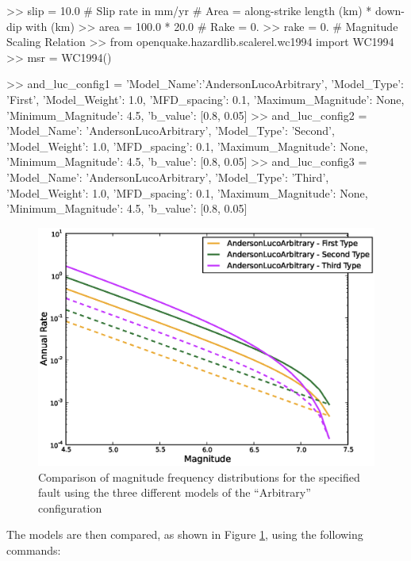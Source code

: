 \begin{python}[frame=single]
>> slip = 10.0  # Slip rate in mm/yr
# Area = along-strike length (km) * down-dip with (km)
>> area = 100.0 * 20.0
# Rake = 0.
>> rake = 0.
\# Magnitude Scaling Relation
>> from openquake.hazardlib.scalerel.wc1994 import WC1994
>> msr = WC1994()

>> and_luc_config1 = {'Model_Name':'AndersonLucoArbitrary',
                      'Model_Type': 'First',
                      'Model_Weight': 1.0,  
                      'MFD_spacing': 0.1,
                      'Maximum_Magnitude': None,
                      'Minimum_Magnitude': 4.5,
                      'b_value': [0.8, 0.05]}
>> and_luc_config2 = {'Model_Name': 'AndersonLucoArbitrary',
                      'Model_Type': 'Second',
                      'Model_Weight': 1.0,
                      'MFD_spacing': 0.1,
                      'Maximum_Magnitude': None,
                      'Minimum_Magnitude': 4.5,
                      'b_value': [0.8, 0.05]}
>> and_luc_config3 = {'Model_Name': 'AndersonLucoArbitrary',
                      'Model_Type': 'Third',
                      'Model_Weight': 1.0,   
                      'MFD_spacing': 0.1,
                      'Maximum_Magnitude': None,
                      'Minimum_Magnitude': 4.5,
                      'b_value': [0.8, 0.05]}
\end{python}
\begin{figure}[htb]
  \centering
      \includegraphics[trim=5mm 5mm 5mm 5mm, clip, width=12cm]{./figures/anderson_luco_arbitrary_mfds.eps}
  \caption{Comparison of magnitude frequency distributions for the specified fault using the three different models of the \cite{AndersonLuco1983} ``Arbitrary'' configuration}
  \label{fig:anderson_luco_arb}
\end{figure}
The models are then compared, as shown in Figure \ref{fig:anderson_luco_arb}, using the following commands:

